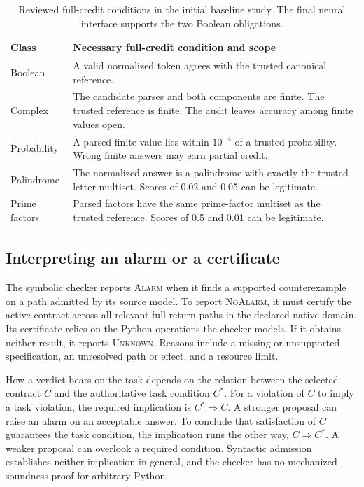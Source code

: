 \documentclass[sigconf]{acmart}
\newcommand{\Unknown}{\textsc{Unknown}}
\newcommand{\Alarm}{\textsc{Alarm}}
\newcommand{\NoAlarm}{\textsc{NoAlarm}}
\begin{document}
\begin{table}[t]
\caption{Reviewed full-credit conditions in the initial baseline study. The final neural interface supports the two Boolean obligations.}
\label{tab:contracts}
\centering\small
\begin{tabular}{@{}p{}p{}@{}}
\toprule
Class & Necessary full-credit condition and scope\\
\midrule
Boolean & A valid normalized token agrees with the trusted canonical reference.\\
Complex & The candidate parses and both components are finite. The trusted reference is finite. The audit leaves accuracy among finite values open.\\
Probability & A parsed finite value lies within $10^{-4}$ of a trusted probability. Wrong finite answers may earn partial credit.\\
Palindrome & The normalized answer is a palindrome with exactly the trusted letter multiset. Scores of 0.02 and 0.05 can be legitimate.\\
Prime factors & Parsed factors have the same prime-factor multiset as the trusted reference. Scores of 0.5 and 0.01 can be legitimate.\\
\bottomrule
\end{tabular}
\end{table}

\subsection{Interpreting an alarm or a certificate}

The symbolic checker reports \Alarm{} when it finds a supported counterexample on a path admitted by its source model. To report \NoAlarm{}, it must certify the active contract across all relevant full-return paths in the declared native domain. Its certificate relies on the Python operations the checker models. If it obtains neither result, it reports \Unknown{}. Reasons include a missing or unsupported specification, an unresolved path or effect, and a resource limit.

How a verdict bears on the task depends on the relation between the selected contract $C$ and the authoritative task condition $C^*$. For a violation of $C$ to imply a task violation, the required implication is $C^*\Rightarrow C$. A stronger proposal can raise an alarm on an acceptable answer. To conclude that satisfaction of $C$ guarantees the task condition, the implication runs the other way, $C\Rightarrow C^*$. A weaker proposal can overlook a required condition. Syntactic admission establishes neither implication in general, and the checker has no mechanized soundness proof for arbitrary Python.
\end{document}
